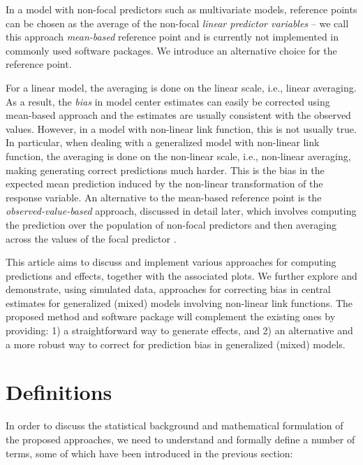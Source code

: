 In a model with non-focal predictors such as multivariate models, reference points can be chosen as the average of the non-focal \emph{linear predictor variables} -- we call this approach \emph{mean-based} reference point and is currently not implemented in commonly used  software packages. We introduce an alternative choice for the reference point.

For a linear model, the averaging is done on the linear scale, i.e., linear averaging. As a result, the \emph{bias} in model center estimates can easily be corrected using mean-based approach and the estimates are usually consistent with the observed values. However, in a model with non-linear link function, this is not usually true. In particular, when dealing with a generalized model with non-linear link function, the averaging is done on the non-linear scale, i.e., non-linear averaging, making generating correct predictions much harder. This is the bias in the expected mean prediction induced by the non-linear transformation of the response variable. An alternative to the mean-based reference point is the \emph{observed-value-based} approach, discussed in detail later, which involves computing the prediction over the population of non-focal predictors and then averaging across the values of the focal predictor \citep{hanmer2013behind}. 

This article aims to discuss and implement various approaches for computing predictions and effects, together with the associated plots. We further explore and demonstrate, using simulated data, approaches for correcting bias in central estimates for generalized (mixed) models involving non-linear link functions. The proposed method and  software package will complement the existing ones by providing: 1) a straightforward way to generate effects, and 2) an alternative and a more robust way to correct for prediction bias in generalized (mixed) models.


\section{Definitions}

In order to discuss the statistical background and mathematical formulation of the proposed approaches, we need to understand and formally define a number of terms, some of which have been introduced in the previous section:



